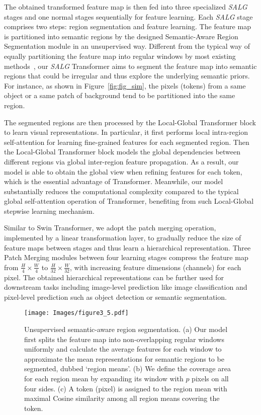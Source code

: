 The obtained transformed feature map is then fed into three specialized \emph{SALG} stages and one normal stages sequentially for feature learning. Each \emph{SALG} stage comprises two steps: region segmentation and feature learning. The feature map is partitioned into semantic regions by the designed Semantic-Aware Region Segmentation module in an unsupervised way. Different from the typical way of equally partitioning the feature map into regular windows by most existing methods~\cite{liu2021swin,chen2021regionvit,chu2021twins,vaswani2021scaling,huang2021shuffle,fang2022msg}, our \emph{SALG} Transformer aims to segment the feature map into semantic regions that could be irregular and thus explore the underlying semantic priors. For instance, as shown in Figure~\ref{fig:fig_sim}, the pixels (tokens) from a same object or a same patch of background tend to be partitioned into the same region. 


The segmented regions are then processed by the Local-Global Transformer block to learn visual representations. In particular, it first performs local intra-region self-attention for learning fine-grained features for each segmented region. Then the Local-Global Transformer block models the global dependencies between different regions via global inter-region feature propagation. As a result, our model is able to obtain the global view when refining features for each token, which is the essential advantage of Transformer. Meanwhile, our model substantially reduces the computational complexity compared to the typical global self-attention operation of Transformer, benefiting from such Local-Global stepwise learning mechanism.

Similar to Swin Transformer, we adopt the patch merging operation, implemented by a linear transformation layer, to gradually reduce the size of feature maps between stages and thus learn a hierarchical representation. Three Patch Merging modules between four learning stages compress the feature map from $\frac{H}{4} \times \frac{W}{4}$ to $\frac{H}{32} \times \frac{W}{32}$, with increasing feature dimensions (channels) for each pixel. The obtained hierarchical representations can be further used for downstream tasks including image-level prediction like image classification and pixel-level prediction such as object detection or semantic segmentation.

\begin{figure*}[!t]
\centering
\texttt{[image: Images/figure3\_5.pdf]}
\caption{Unsupervised semantic-aware region segmentation. (a) Our model first splits the feature map into non-overlapping regular windows uniformly and calculate the average features for each window to approximate the mean representations for semantic regions to be segmented, dubbed `region means'. (b) We define the coverage area for each region mean by expanding its window with $p$ pixels on all four sides. (c) A token (pixel) is assigned to the region mean with maximal Cosine similarity among all region means covering the token.}
\label{fig:fig_seg}
\end{figure*}


